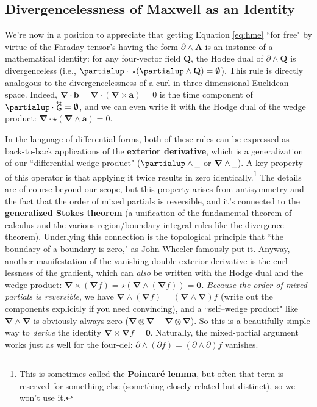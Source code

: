 \documentclass[12pt]{article}
\renewcommand{\vv}[1]{\mathbf{#1}}
\newcommand{\del}{\boldsymbol{\nabla}}
\newcommand{\tightoverset}[2]{%
  \mathop{#2}\limits^{\vbox to -.5ex{\kern-0.75ex\hbox{$#1$}\vss}}}
\newcommand{\inlinedy}[1]{\tightoverset{\text{\tiny$\bm\leftrightarrow$}}{#1}}
\begin{document}
\subsection{Divergencelessness of Maxwell as an Identity}\label{sssec:dedv}

We're now in a position to appreciate that getting Equation \ref{eq:hme} ``for free" by virtue of the Faraday tensor's having the form $\partialup \wedge \vv A$ is an instance of a mathematical identity: for any four-vector field $\vv Q$, the Hodge dual of $\partialup \wedge \vv Q$ is divergenceless (i.e., $\partialup \cdot \, \star ( \partialup \wedge \vv Q ) = \textrm{\mbox{\boldmath $\emptyset$}}$). This rule is directly analogous to the divergencelessness of a curl in three-dimensional Euclidean space. Indeed, $\del \cdot \vv b = \del \cdot ( \del \times \vv a ) = 0$ is the time component of $\partialup \cdot \inlinedy{\mathsf{G}} = \textrm{\mbox{\boldmath $\emptyset$}}$, and we can even write it with the Hodge dual of the wedge product: $\del \cdot \star ( \del \wedge \vv a ) = 0$.

In the language of differential forms, both of these rules can be expressed as back-to-back applications of the \textbf{exterior derivative}, which is a generalization of our ``differential wedge product" ($\partialup \wedge \text{\underline{\hspace{.6em}}}$ or $\del \wedge \text{\underline{\hspace{.6em}}}$). A key property of this operator is that applying it twice results in zero identically.\footnote{This is sometimes called the \textbf{Poincar\'e lemma}, but often that term is reserved for something else (something closely related but distinct), so we won't use it.} The details are of course beyond our scope, but this property arises from antisymmetry and the fact that the order of mixed partials is reversible, and it's connected to the \textbf{generalized Stokes theorem} (a unification of the fundamental theorem of calculus and the various region/boundary integral rules like the divergence theorem). Underlying this connection is the topological principle that ``the boundary of a boundary is zero," as John Wheeler famously put it. Anyway, another manifestation of the vanishing double exterior derivative is the curl-lessness of the gradient, which can \emph{also} be written with the Hodge dual and the wedge product: $\del \times ( \del f ) = \star ( \del \wedge ( \del f ) ) = \vv 0 $. \emph{Because the order of mixed partials is reversible}, we have $\del \wedge ( \del f ) = ( \del \wedge \del ) f$ (write out the components explicitly if you need convincing), and a ``self--wedge product" like $ \del \wedge \del $ is obviously always zero ($\del \otimes \del - \del \otimes \del$). So this is a beautifully simple way to \emph{derive} the identity ${ \del \times \del f = \vv 0 }$. Naturally, the mixed-partial argument works just as well for the four-del: ${ \partialup \wedge ( \partialup f ) = ( \partialup \wedge \partialup ) f }$ vanishes.
\end{document}
